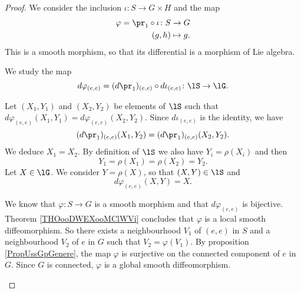 \begin{proof}
    We consider the inclusion \( \iota\colon S\to G\times H\) and the map
    \begin{equation}
        \begin{aligned}
            \varphi=\pr_1\circ\iota\colon S &\to G \\
            (g,h)&\mapsto g.
        \end{aligned}
    \end{equation}
    This is a smooth morphism, so that its differential is a morphism of Lie algebra.
    \begin{subproof}
        We study the map
        \begin{equation}
            d\varphi_{(e,e)}=(d\pr_1)_{(e,e)}\circ d\iota_{(e,e)}\colon \lS\to \lG.
        \end{equation}
        \begin{subproof}
        \spitem[Injection]
            Let \( (X_1,Y_1)\) and \( (X_2,Y_2)\) be elements of \( \lS\) such that \( d\varphi_{(e,e)}(X_1,Y_1)=d\varphi_{(e,e)}(X_2,Y_2)\). Since \( d\iota_{(e,e)}\) is the identity, we have
            \begin{equation}
                (d\pr_1)_{(e,e)}(X_1,Y_2)=(d\pr_1)_{(e,e)}(X_2,Y_2).
            \end{equation}
            We deduce \( X_1=X_2\). By definition of \( \lS\) we also have \( Y_i=\rho(X_i)\) and then
            \begin{equation}
                Y_1=\rho(X_1)=\rho(X_2)=Y_2.
            \end{equation}
        \spitem[Surjection]
            Let \( X\in\lG\). We consider \( Y=\rho(X)\), so that \( (X,Y)\in \lS\) and
            \begin{equation}
                d\varphi_{(e,e)}(X,Y)=X.
            \end{equation}
        \end{subproof}
    \spitem[Diffeomorphism]
        We know that \( \varphi\colon S\to G\) is a smooth morphism and that \( d\varphi_{(e,e)}\) is bijective. Theorem \ref{THOooDWEXooMClWVi} concludes that \( \varphi\) is a local smooth diffeomorphism. So there exists a neighbourhood \( V_1\) of \( (e,e)\) in \( S\) and a neighbourhood \( V_2\) of \( e\) in \( G\) such that \( V_2=\varphi(V_1)\). By proposition \ref{PropUssGpGenere}, the map \( \varphi\) is surjective on the connected component of \( e\) in \( G\). Since \( G\) is connected, \( \varphi\) is a global smooth diffeomorphism.

\end{subproof}
\end{proof}
